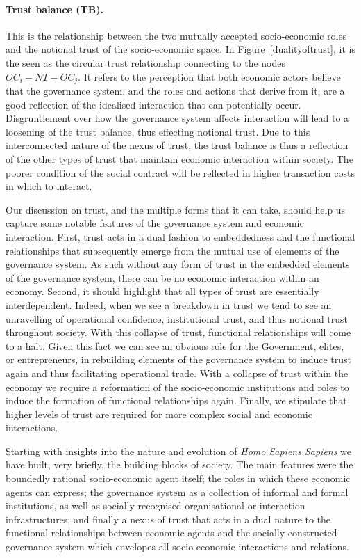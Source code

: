 \begin{subappendices}
\paragraph{Trust balance (TB).}

This is the relationship between the two mutually accepted socio-economic roles and the notional trust of the socio-economic space. In Figure~\ref{dualityoftrust}, it is the seen as the circular trust relationship connecting to the nodes $OC_{i}-NT-OC_{j}$. It refers to the perception that both economic actors believe that the governance system, and the roles and actions that derive from it, are a good reflection of the idealised interaction that can potentially occur. Disgruntlement over how the governance system affects interaction will lead to a loosening of the trust balance, thus effecting notional trust. Due to this interconnected nature of the nexus of trust, the trust balance is thus a reflection of the other types of trust that maintain economic interaction within society. The poorer condition of the social contract will be reflected in higher transaction costs in which to interact.

Our discussion on trust, and the multiple forms that it can take, should help us capture some notable features of the governance system and economic interaction. First, trust acts in a dual fashion to embeddedness and the functional relationships that subsequently emerge from the mutual use of elements of the governance system. As such without any form of trust in the embedded elements of the governance system, there can be no economic interaction within an economy. Second, it should highlight that all types of trust are essentially interdependent. Indeed, when we see a breakdown in trust we tend to see an unravelling of operational confidence, institutional trust, and thus notional trust throughout society. With this collapse of trust, functional relationships will come to a halt. Given this fact we can see an obvious role for the Government, elites, or entrepreneurs, in rebuilding elements of the governance system to induce trust again and thus facilitating operational trade. With a collapse of trust within the economy we require a reformation of the socio-economic institutions and roles to induce the formation of functional relationships again. Finally, we stipulate that higher levels of trust are required for more complex social and economic interactions.

\medskip\noindent Starting with insights into the nature and evolution of \textit{Homo Sapiens Sapiens} we have built, very briefly, the building blocks of society. The main features were the boundedly rational socio-economic agent itself; the roles in which these economic agents can express; the governance system as a collection of informal and formal institutions, as well as socially recognised organisational or interaction infrastructures; and finally a nexus of trust that acts in a dual nature to the functional relationships between economic agents and the socially constructed governance system which envelopes all socio-economic interactions and relations.


\end{subappendices}
